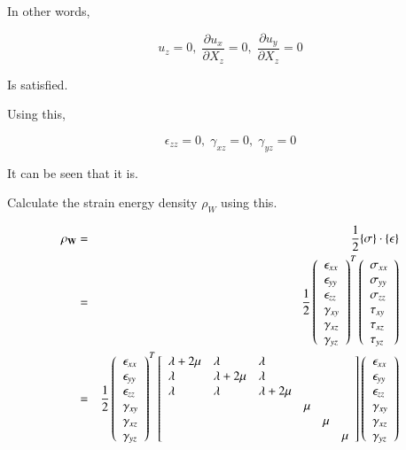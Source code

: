 In other words,

\begin{equation}
u_z=0,\;\frac{\partial u_x}{\partial X_z}=0,\;\frac{\partial u_y}{\partial X_z}=0
\end{equation}


Is satisfied.

Using this,

\begin{equation}
\epsilon_{zz}=0,\;\gamma_{xz}=0,\;\gamma_{yz}=0
\end{equation}

It can be seen that it is.

Calculate the strain energy density $\rho_{W}$ using this.

\begin{eqnarray}
\rho_{\mathbf{W}}
&=& \frac{1}{2}\{\mathbf{\sigma}\}\cdot\{\mathbf{\epsilon}\}\\
&=&	\frac{1}{2}\left(\begin{array}{l}
\epsilon_{xx}\\
\epsilon_{yy}\\
\epsilon_{zz}\\
\gamma_{xy}\\
\gamma_{xz}\\
\gamma_{yz}
\end{array}\right)^T
\left(\begin{array}{l}
\sigma_{xx}\\
\sigma_{yy}\\
\sigma_{zz}\\
\tau_{xy}\\
\tau_{xz}\\
\tau_{yz}
\end{array}\right)\\
&=&
\frac{1}{2}\left(\begin{array}{l}
\epsilon_{xx}\\
\epsilon_{yy}\\
\epsilon_{zz}\\
\gamma_{xy}\\
\gamma_{xz}\\
\gamma_{yz}
\end{array}\right)^T
\left[\begin{array}{llllll}
\lambda+2\mu & \lambda & \lambda\\
\lambda & \lambda+2\mu & \lambda\\
\lambda & \lambda & \lambda+2\mu\\
& & & \mu&   & \\
& & &    &\mu& \\
& & &    &   &\mu
\end{array}\right]
\left(\begin{array}{l}
\epsilon_{xx}\\
\epsilon_{yy}\\
\epsilon_{zz}\\
\gamma_{xy}\\
\gamma_{xz}\\
\gamma_{yz}
\end{array}\right)
\end{eqnarray}


